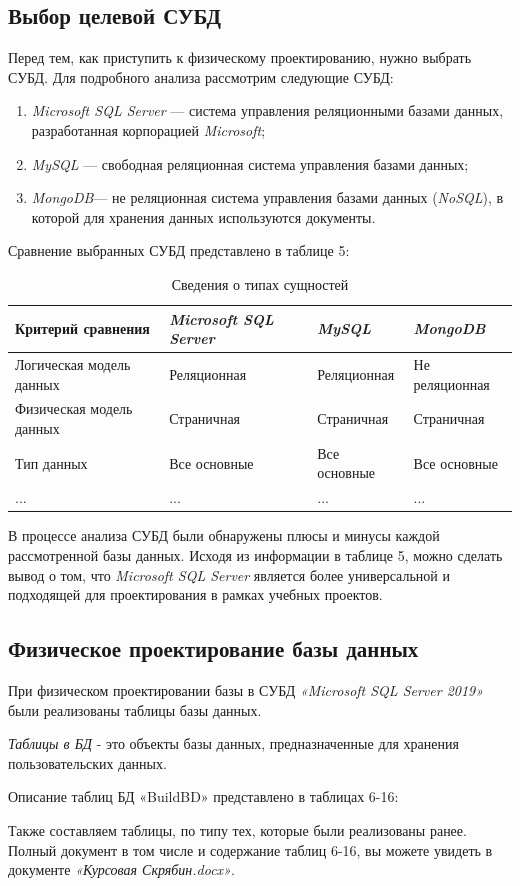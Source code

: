 \documentclass{../SIBGU-state}
\begin{document}
\subsection{Выбор целевой СУБД}
Перед тем, как приступить к физическому проектированию, нужно выбрать СУБД. Для подробного анализа рассмотрим следующие СУБД: \par
\begin{enumerate}
	\item \textit{Microsoft SQL Server} — система управления реляционными базами данных, разработанная корпорацией \textit{Microsoft};
	\item \textit{MySQL} — свободная реляционная система управления базами данных;
    \item \textit{MongoDB}— не реляционная система управления базами данных (\textit{NoSQL}), в которой для хранения данных используются документы.
\end{enumerate}
Сравнение выбранных СУБД представлено в таблице 5: \par
\begin{table}[htb]
	\caption{Сведения о типах сущностей}
	\centering
	\small\begin{tabular}{ |p{2cm}|p{3.5cm}|p{5.4cm}|p{4cm}| }
        \hline
		Критерий сравнения & \textit{Microsoft SQL Server} & \textit{MySQL} & \textit{MongoDB} \\ \hline
        Логическая модель данных & Реляционная & Реляционная & Не реляционная \\ \hline
        Физическая модель данных & Страничная & Страничная & Страничная \\ \hline
        Тип данных & Все основные & Все основные & Все основные \\ \hline
        ... & ... & ... & ... \\ \hline
	\end{tabular}
	\label{tab:in_appendix}
\end{table}\par
В процессе анализа СУБД были обнаружены плюсы и минусы каждой рассмотренной базы данных. Исходя из информации в таблице 5, можно сделать вывод о том, что \textit{Microsoft SQL Server} является более универсальной и подходящей для проектирования в рамках учебных проектов.

\subsection{Физическое проектирование базы данных}
При физическом проектировании базы в СУБД \textit{«Microsoft SQL Server 2019»} были реализованы таблицы базы данных. \par
\textit{Таблицы в БД} - это объекты базы данных, предназначенные для хранения пользовательских данных. \par
Описание таблиц БД «BuildBD» представлено в таблицах 6-16: \par\bigskip
Также составляем таблицы, по типу тех, которые были реализованы ранее. Полный документ в том числе и содержание таблиц 6-16, вы можете увидеть в документе \textit{«Курсовая Скрябин.docx»}. \par
\end{document}
